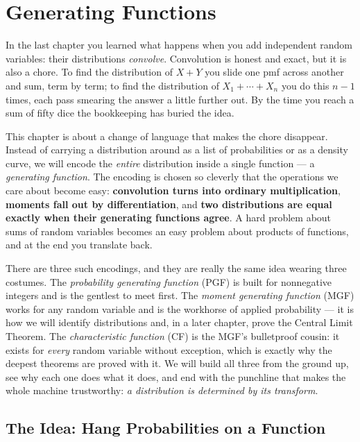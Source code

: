 \chapter{Generating Functions}

In the last chapter you learned what happens when you add independent random
variables: their distributions \emph{convolve}. Convolution is honest and
exact, but it is also a chore. To find the distribution of $X+Y$ you slide one
pmf across another and sum, term by term; to find the distribution of
$X_1+\cdots+X_n$ you do this $n-1$ times, each pass smearing the answer a little
further out. By the time you reach a sum of fifty dice the bookkeeping has
buried the idea.

This chapter is about a change of language that makes the chore disappear.
Instead of carrying a distribution around as a list of probabilities or as a
density curve, we will encode the \emph{entire} distribution inside a single
function --- a \emph{generating function}. The encoding is chosen so cleverly
that the operations we care about become easy: \textbf{convolution turns into
ordinary multiplication}, \textbf{moments fall out by differentiation}, and
\textbf{two distributions are equal exactly when their generating functions
agree}. A hard problem about sums of random variables becomes an easy problem
about products of functions, and at the end you translate back.

There are three such encodings, and they are really the same idea wearing three
costumes. The \emph{probability generating function} (PGF) is built for
nonnegative integers and is the gentlest to meet first. The \emph{moment
generating function} (MGF) works for any random variable and is the workhorse of
applied probability --- it is how we will identify distributions and, in a later
chapter, prove the Central Limit Theorem. The \emph{characteristic function}
(CF) is the MGF's bulletproof cousin: it exists for \emph{every} random
variable without exception, which is exactly why the deepest theorems are proved
with it. We will build all three from the ground up, see why each one does what
it does, and end with the punchline that makes the whole machine trustworthy:
\emph{a distribution is determined by its transform}.

\chapterline

\section{The Idea: Hang Probabilities on a Function}
\label{ch18:idea}

